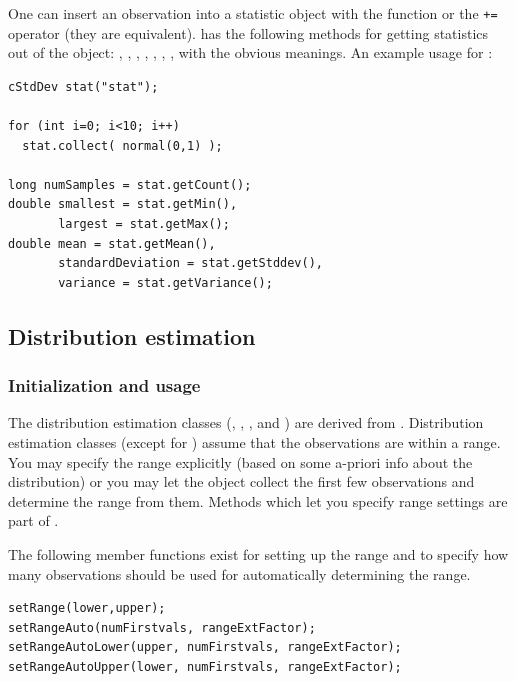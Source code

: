 One can insert an observation into a statistic object with the
 function or the \texttt{+=} operator (they are
equivalent).   has the following methods for getting
statistics out of the object: , ,
, , , ,
,  with the obvious meanings. An example
usage for :

\begin{verbatim}
cStdDev stat("stat");

for (int i=0; i<10; i++)
  stat.collect( normal(0,1) );

long numSamples = stat.getCount();
double smallest = stat.getMin(),
       largest = stat.getMax();
double mean = stat.getMean(),
       standardDeviation = stat.getStddev(),
       variance = stat.getVariance();
\end{verbatim}





\subsection{Distribution estimation}

\subsubsection{Initialization and usage}


The distribution estimation classes
(, , ,
 and ) are derived from
. Distribution estimation classes (except for
) assume that the observations are within a range.
You may specify the range explicitly (based on some a-priori info
about the distribution) or you may let the object collect the first
few observations and determine the range from them. Methods which let
you specify range settings are part of .

The following member functions exist for setting up the range
and to specify how many observations should be used for
automatically determining the range.

\begin{verbatim}
setRange(lower,upper);
setRangeAuto(numFirstvals, rangeExtFactor);
setRangeAutoLower(upper, numFirstvals, rangeExtFactor);
setRangeAutoUpper(lower, numFirstvals, rangeExtFactor);
\end{verbatim}

